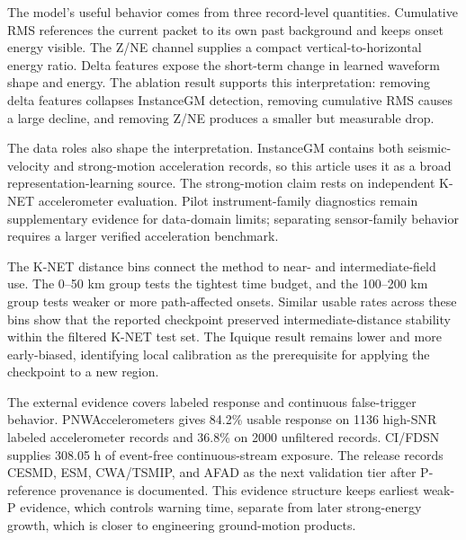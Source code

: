 \documentclass[journal]{IEEEtran}
\begin{document}
The model's useful behavior comes from three record-level quantities. Cumulative RMS references the current packet to its own past background and keeps onset energy visible. The Z/NE channel supplies a compact vertical-to-horizontal energy ratio. Delta features expose the short-term change in learned waveform shape and energy. The ablation result supports this interpretation: removing delta features collapses InstanceGM detection, removing cumulative RMS causes a large decline, and removing Z/NE produces a smaller but measurable drop.

The data roles also shape the interpretation. InstanceGM contains both seismic-velocity and strong-motion acceleration records, so this article uses it as a broad representation-learning source. The strong-motion claim rests on independent K-NET accelerometer evaluation. Pilot instrument-family diagnostics remain supplementary evidence for data-domain limits; separating sensor-family behavior requires a larger verified acceleration benchmark.

The K-NET distance bins connect the method to near- and intermediate-field use. The 0--50 km group tests the tightest time budget, and the 100--200 km group tests weaker or more path-affected onsets. Similar usable rates across these bins show that the reported checkpoint preserved intermediate-distance stability within the filtered K-NET test set. The Iquique result remains lower and more early-biased, identifying local calibration as the prerequisite for applying the checkpoint to a new region.

The external evidence covers labeled response and continuous false-trigger behavior. PNWAccelerometers gives 84.2\% usable response on 1136 high-SNR labeled accelerometer records and 36.8\% on 2000 unfiltered records. CI/FDSN supplies 308.05 h of event-free continuous-stream exposure. The release records CESMD, ESM, CWA/TSMIP, and AFAD as the next validation tier after P-reference provenance is documented. This evidence structure keeps earliest weak-P evidence, which controls warning time, separate from later strong-energy growth, which is closer to engineering ground-motion products.
\end{document}
